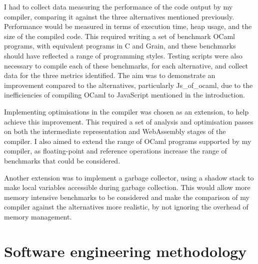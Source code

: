 I had to collect data measuring the performance of the code output by my compiler, comparing it against the three alternatives mentioned previously. Performance would be measured in terms of execution time, heap usage, and the size of the compiled code. This required writing a set of benchmark OCaml programs, with equivalent programs in C and Grain, and these benchmarks should have reflected a range of programming styles. Testing scripts were also necessary to compile each of these benchmarks, for each alternative, and collect data for the three metrics identified. The aim was to demonstrate an improvement compared to the alternatives, particularly Js\_of\_ocaml, due to the inefficiencies of compiling OCaml to JavaScript mentioned in the introduction.



Implementing optimisations in the compiler was chosen as an extension, to help achieve this improvement. This required a set of analysis and optimisation passes on both the intermediate representation and WebAssembly stages of the compiler. I also aimed to extend the range of OCaml programs supported by my compiler, as floating-point and reference operations increase the range of benchmarks that could be considered. %

Another extension was to implement a garbage collector, using a shadow stack to make local variables accessible during garbage collection. This would allow more memory intensive benchmarks to be considered and make the comparison of my compiler against the alternatives more realistic, by not ignoring the overhead of memory management. %



\section{Software engineering methodology}

